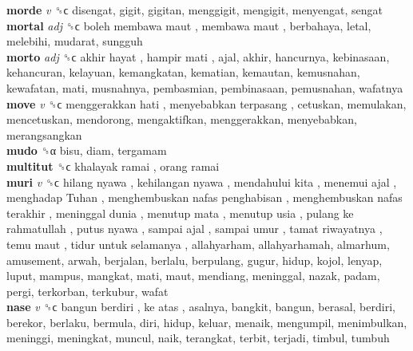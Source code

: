 \textbf{morde} \emph{v}  ␝ϲ  disengat, gigit, gigitan, menggigit, mengigit, menyengat, sengat  \\
\textbf{mortal} \emph{adj}  ␝ϲ   boleh membawa maut ,  membawa maut , berbahaya, letal, melebihi, mudarat, sungguh  \\
\textbf{morto} \emph{adj}  ␝ϲ   akhir hayat ,  hampir mati , ajal, akhir, hancurnya, kebinasaan, kehancuran, kelayuan, kemangkatan, kematian, kemautan, kemusnahan, kewafatan, mati, musnahnya, pembasmian, pembinasaan, pemusnahan, wafatnya  \\
\textbf{move} \emph{v}  ␝ϲ   menggerakkan hati ,  menyebabkan terpasang , cetuskan, memulakan, mencetuskan, mendorong, mengaktifkan, menggerakkan, menyebabkan, merangsangkan  \\
\textbf{mudo} ␝α  bisu, diam, tergamam  \\
\textbf{multitut} ␝ϲ   khalayak ramai ,  orang ramai   \\
\textbf{muri} \emph{v}  ␝ϲ   hilang nyawa ,  kehilangan nyawa ,  mendahului kita ,  menemui ajal ,  menghadap Tuhan ,  menghembuskan nafas penghabisan ,  menghembuskan nafas terakhir ,  meninggal dunia ,  menutup mata ,  menutup usia ,  pulang ke rahmatullah ,  putus nyawa ,  sampai ajal ,  sampai umur ,  tamat riwayatnya ,  temu maut ,  tidur untuk selamanya , allahyarham, allahyarhamah, almarhum, amusement, arwah, berjalan, berlalu, berpulang, gugur, hidup, kojol, lenyap, luput, mampus, mangkat, mati, maut, mendiang, meninggal, nazak, padam, pergi, terkorban, terkubur, wafat  \\
\textbf{nase} \emph{v}  ␝ϲ   bangun berdiri ,  ke atas , asalnya, bangkit, bangun, berasal, berdiri, berekor, berlaku, bermula, diri, hidup, keluar, menaik, mengumpil, menimbulkan, meninggi, meningkat, muncul, naik, terangkat, terbit, terjadi, timbul, tumbuh  \\
